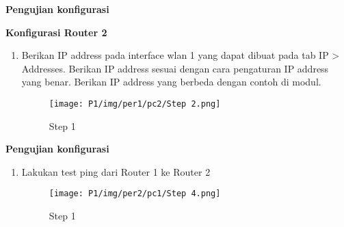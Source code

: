 \begin{enumerate}
\begin{center}
\textbf{Pengujian konfigurasi}

	\textbf{Konfigurasi Router 2}
	\begin{enumerate}
		\item Berikan IP address pada interface wlan 1 yang dapat dibuat pada tab IP > Addresses. Berikan IP address sesuai dengan cara pengaturan IP address yang benar. Berikan IP address yang berbeda dengan contoh di modul.
		      \begin{figure}[H]
			      \centering
			      \texttt{[image: P1/img/per1/pc2/Step 2.png]}
			      \caption{Step 1}
			      \label{fig:Step 1(Per.2 PC2)}
		      \end{figure}
	\end{enumerate}

	\textbf{Pengujian konfigurasi}
	\begin{enumerate}
		\item Lakukan test ping dari Router 1 ke Router 2
		      \begin{figure}[H]
			      \centering
			      \texttt{[image: P1/img/per2/pc1/Step 4.png]}
			      \caption{Step 1}
			      \label{fig:Ping Step 1(Per.2 PC1)}
		      \end{figure}
	\end{enumerate}


\end{center}
\end{enumerate}
